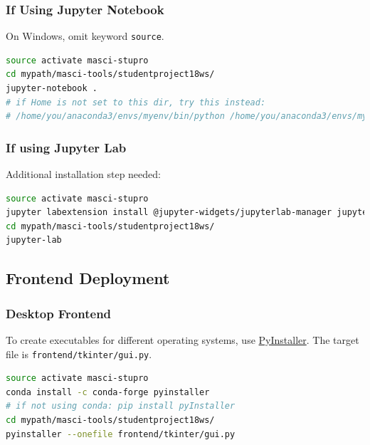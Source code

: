 \subsubsection{If Using Jupyter
  Notebook}\label{if-using-jupyter-notebook}

On Windows, omit keyword \texttt{source}.

\begin{lstlisting}[language=bash, style=code]
source activate masci-stupro
cd mypath/masci-tools/studentproject18ws/
jupyter-notebook .
# if Home is not set to this dir, try this instead:
# /home/you/anaconda3/envs/myenv/bin/python /home/you/anaconda3/envs/myenv/bin/jupyter-notebook .
\end{lstlisting}

\subsubsection{If using Jupyter Lab}\label{if-using-jupyter-lab}

Additional installation step needed:

\begin{lstlisting}[language=bash, style=code]
source activate masci-stupro
jupyter labextension install @jupyter-widgets/jupyterlab-manager jupyter-matplotlib ipyvolume
cd mypath/masci-tools/studentproject18ws/
jupyter-lab
\end{lstlisting}

\subsection{Frontend Deployment}\label{frontend-deployment}

\subsubsection{Desktop Frontend}\label{desktop-frontend-1}

To create executables for different operating systems, use
\href{https://www.pyinstaller.org/}{PyInstaller}. The target file is
\texttt{frontend/tkinter/gui.py}.

\begin{lstlisting}[language=bash, style=code]
source activate masci-stupro
conda install -c conda-forge pyinstaller
# if not using conda: pip install pyInstaller
cd mypath/masci-tools/studentproject18ws/
pyinstaller --onefile frontend/tkinter/gui.py
\end{lstlisting}

